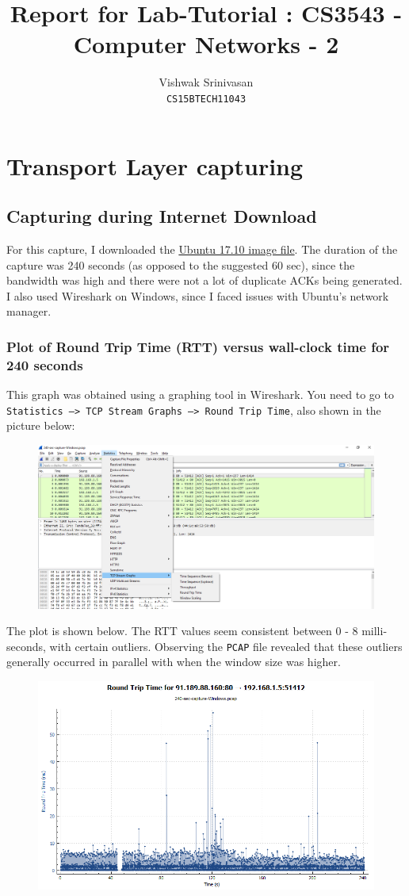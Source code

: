 \documentclass{article}
\title{Report for Lab-Tutorial : CS3543 - Computer Networks - 2}
\author{Vishwak Srinivasan\\
\texttt{CS15BTECH11043}}
\date{}
\begin{document}
\maketitle 

\section{Transport Layer capturing}
\subsection{Capturing during Internet Download}
\begin{flushleft}
For this capture, I downloaded the \href{http://releases.ubuntu.com/17.10/ubuntu-17.10.1-desktop-amd64.iso}{Ubuntu 17.10 image file}. The duration of the capture was 240 seconds (as opposed to the suggested 60 sec), since the bandwidth was high and there were not a lot of duplicate ACKs being generated. I also used Wireshark on Windows, since I faced issues with Ubuntu's network manager.
\end{flushleft}

\subsubsection{Plot of Round Trip Time (RTT) versus wall-clock time for 240 seconds}
\begin{flushleft}
This graph was obtained using a graphing tool in Wireshark. You need to go to \texttt{Statistics --> TCP Stream Graphs --> Round Trip Time}, also shown in the picture below:
\begin{figure}[H]
\centering
\includegraphics[width=0.6\linewidth]{RTT-Window-size-capture-process.png}
\end{figure}

The plot is shown below. The RTT values seem consistent between 0 - 8 milli-seconds, with certain outliers. Observing the \texttt{PCAP} file revealed that these outliers generally occurred in parallel with when the window size was higher.
\begin{figure}[H]
\centering
\includegraphics[width=0.65\linewidth]{RTT-variation-240-sec-capture-Windows-time.png}
\end{figure}
\end{flushleft}
\end{document}
